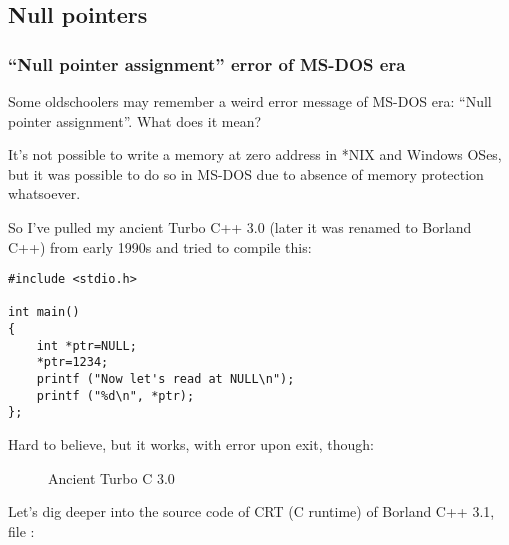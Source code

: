 \subsection{Null pointers}

\subsubsection{``Null pointer assignment'' error of MS-DOS era}

Some oldschoolers may remember a weird error message of MS-DOS era: ``Null pointer assignment''.
What does it mean?

It's not possible to write a memory at zero address in *NIX and Windows OSes, but it was possible to do so in MS-DOS due to absence of memory protection whatsoever.

So I've pulled my ancient Turbo C++ 3.0 (later it was renamed to Borland C++) from early 1990s and tried to compile this:

\begin{lstlisting}
#include <stdio.h>

int main()
{
	int *ptr=NULL;
	*ptr=1234;
	printf ("Now let's read at NULL\n");
	printf ("%d\n", *ptr);
};
\end{lstlisting}

Hard to believe, but it works, with error upon exit, though:

\begin{figure}[H]
\centering
\ifdefined\ebook
{}
\else
{}
\fi
\caption{Ancient Turbo C 3.0}
\end{figure}

Let's dig deeper into the source code of CRT (C runtime) of Borland C++ 3.1, file :

